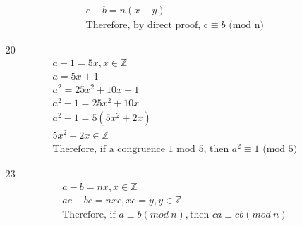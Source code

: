 \documentclass[12pt]{article}
\begin{document}
\begin{enumerate}
\begin{equation*}
\begin{split}
		    c-b = n(x - y)\\
		    \text{Therefore, by direct proof, c$\equiv b$ (mod n)}
	    	\end{split}
	    \end{equation*}
	\item [20] 
	    \begin{equation*}
	    	\begin{split}
		    a - 1 = 5x, x \in \mathbb{Z}\\
		    a = 5x + 1\\
		    a^2 = 25x^2 + 10x + 1\\
		    a^2 - 1 = 25x^2 + 10x\\
		    a^2 - 1 = 5(5x^2 + 2x)\\
		    5x^2 + 2x \in \mathbb{Z}\\
		    \text{Therefore, if a congruence 1 mod 5, then $a^2 \equiv 1$ (mod 5)}
	    	\end{split}
	    \end{equation*}
	\item [23] 
	    \begin{equation*}
	    	\begin{split}
		    a -b = nx, x \in \mathbb{Z}\\
		    ac - bc = nxc, xc = y, y \in \mathbb{Z}\\
		    \text{Therefore, if $a \equiv b (mod\ n),$then $ca\equiv cb (mod\ n)$}
	    	\end{split}
	    \end{equation*}
\end{enumerate}
\end{document}
